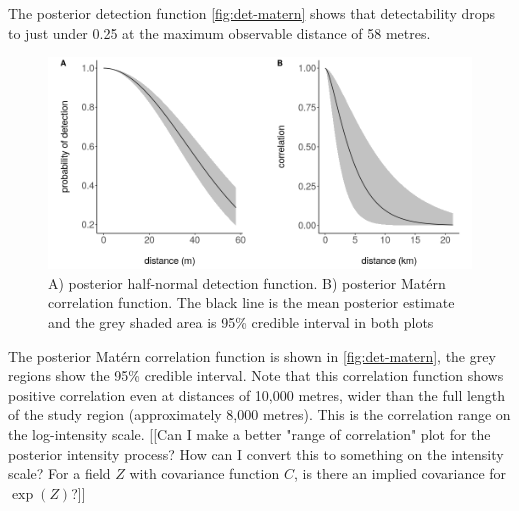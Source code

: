 \documentclass{stylefile16/statsoc}
\begin{document}
The posterior detection function \autoref{fig:det-matern} shows that detectability drops to just under 0.25 at the maximum observable distance of 58 metres.
\begin{figure}[!htb]
	\begin{center}
		\includegraphics[scale=0.525]{figures/detfn_and_matern.png}
		\caption{A) posterior half-normal detection function. B) posterior Mat\'ern correlation function.  The black line is the mean posterior estimate and the grey shaded area is 95\% credible interval in both plots}
		\label{fig:det-matern}
	\end{center}
\end{figure}
The posterior Mat\'ern correlation function is shown in \autoref{fig:det-matern}, the grey regions show the 95\% credible interval.  Note that this correlation function shows positive correlation even at distances of 10,000 metres, wider than the full length of the study region (approximately 8,000 metres).  This is the correlation range on the log-intensity scale.  [[Can I make a better "range of correlation" plot for the posterior intensity process?  How can I convert this to something on the intensity scale?  For a field $Z$ with covariance function $C$, is there an implied covariance for $\exp(Z)$?]]
\end{document}
